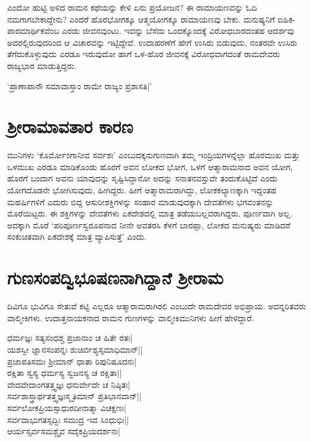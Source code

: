 ಎಂದೋ ಹುಟ್ಟಿ ಅಳಿದ ರಾಮನ ಕಥೆಯನ್ನು ಕೇಳಿ ಏನು ಪ್ರಯೋಜನ? ಈ ರಾಮಾಯಣವನ್ನು ಓದಿ ನಮಗಾಗಬೇಕಾದ್ದೇನು? ಎಂದರೆ ಹೊರಭೋಗಕ್ಕೂ ಆತ್ಮಯೋಗಕ್ಕೂ ರಾಮಾಯಣವು ಬೇಕು. ಮನುಷ್ಯನಿಗೆ ಐಹಿಕ-ಪಾರಮಾರ್ಥಿಕವೆಂಬ ಎರಡು ಜೀವನವುಂಟು. ಇವನ್ನು ಬೆಸೆದು ಒಂದಕ್ಕೊಂದಕ್ಕೆ ವಿರೋಧಬಾರದಂತಹ ಆದರ್ಶವು ಅದರಲ್ಲಿರುವುದರಿಂದ ಆ‌ ವಿಚಾರವನ್ನು ಇಟ್ಟಿದ್ದೇವೆ. ಉದಾಹರಣೆಗೆ ಹೇಗೆ ಉಸಿರು ಬಿಡುವುದು, ನಂತರವೇ ಉಸಿರು ತೆಗೆದುಕೊಳ್ಳುವುದು ಎರಡೂ ಇರುವುದೋ ಹಾಗೆ ಒಳ-ಹೊರ ಜೀವನಕ್ಕೆ ವಿರೋಧವಾಗದಂತೆ ರಾಮದೇವರು ರಾಜ್ಯಭಾರ ಮಾಡುತ್ತಿದ್ದರು.

\begin{shloka}
`ಪ್ರಾಣಾಪಾನೌ ಸಮಾವಾಸ್ತಾಂ ರಾಮೇ ರಾಜ್ಯಂ ಪ್ರಶಾಸತಿ|'
\end{shloka}

\section*{ಶ್ರೀರಾಮಾವತಾರ ಕಾರಣ}

ಮುನಿಗಳು `ಕೊರ್ಮೋಂಗಾನೀವ ಸರ್ವಶಃ' ಎಂಬುದಕ್ಕನುಗುಣವಾಗಿ ತಮ್ಮ ಇಂದ್ರಿಯಗಳನ್ನೆಲ್ಲಾ ಹೊರಮುಖ ಮತ್ತು ಒಳಮುಖ ಎರಡೂ ಮಾಡಿಕೊಂಡು ಹೊರಗೆ ಅವನ ಲೋಕದ ಭೋಗ, ಒಳಗೆ ಆತ್ಮಾರಾಮನಾದ ಅವನ ಯೋಗ, ಹೊರಗೆ ಬಂದಾಗ ಅವನು ಯಾವುದನ್ನು ಸೃಷ್ಟಿಸಿದ್ದಾನೋ ಅದನ್ನು ಸನಾತನವಸ್ತುವೇ ತಂದುಕೊಟ್ಟಿದೆ ಎಂದು ಯೋಗದೊಡನೇ ಭೋಗಿಸುವುದು, ಹೀಗಿದ್ದರು. ಹೀಗೆ ಆತ್ಮಾರಾಮರಾಗಿದ್ದು, ಲೋಕಕಲ್ಯಾಣಕ್ಕಾಗಿ ಇದ್ದಂತಹ ಮಹರ್ಷಿಗಳಿಗೆ ಎದುರು ಬಿದ್ದ ಆಸುರೀಶಕ್ತಿಗಳನ್ನು ಸಂಹಾರ ಮಾಡುವುದಕ್ಕಾಗಿ ದೇವತೆಗಳು ಭಗವಂತನನ್ನು ಮೊರೆಯಿಟ್ಟರು. ಈ ಶಕ್ತಿಗಳನ್ನು ದೇವತೆಗಳು ಏಕದೇಶದಲ್ಲಿ ಮಾತ್ರ ತಡೆಯಬಲ್ಲವರಾಗಿದ್ದರು. ಪೂರ್ಣವಾಗಿ ಅಲ್ಲ. ಅದಕ್ಕಾಗಿ ಮೊರೆ `ಪರಿಪೂರ್ಣಸ್ವರೂಪನಾದ ನೀನೇ ಅವತರಸಿ ಕೆಳಗೆ ಬಾರಪ್ಪಾ, ಲೋಕದ ಮನುಷ್ಯರು ಮಾಡಿದರೆ ಸಂಕುಚಿತವಾಗಿ ಏಕದೇಶಕ್ಕೆ ಮಾತ್ರ ವ್ಯಾಪಿಸುತ್ತೆ' ಎಂದು.

\section*{ಗುಣಸಂಪದ್ವಿಭೂಷಣನಾಗಿದ್ದಾನೆ ಶ್ರೀರಾಮ}

ದಿವಿಗೂ ಭುವಿಗೂ ಸೇತುವೆ ಕಟ್ಟಿ ಎಲ್ಲರೂ ಆತ್ಮಾರಾಮರಾಗಿರಲಿ ಎಂಬುದೇ ರಾಮದೇವರ ಅಭಿಪ್ರಾಯ. ಅದನ್ನರಿತವರು ವಾಲ್ಮೀಕಿಗಳು. ಉದಾತ್ತನಾಯಕನಾದ ರಾಮನ ಗುಣಗಳನ್ನು ವಾಲ್ಮೀಕಿಮುನಿಗಳು ಹೀಗೆ ಹೇಳಿದ್ದಾರೆ.

\begin{shloka}
ಧರ್ಮಜ್ಞಃ ಸತ್ಯಸಂಧಶ್ಚ ಪ್ರಜಾನಾಂ ಚ ಹಿತೇ ರತಃ|\\
ಯಶಸ್ವೀ ಜ್ಞಾನಸಂಪನ್ನಃ ಶುಚಿರ್ವಶ್ಯಸ್ಸಮಾಧಿಮಾನ್||\\
ಪ್ರಜಾಪತಿಸಮಃ ಶ್ರೀಮಾನ್ ಧಾತಾ ರಿಪುನಿಷೂದನಃ|\\
ರಕ್ಷಿತಾ ಸ್ವಸ್ಯ ಧರ್ಮಸ್ಯ ಸ್ವಜನಸ್ಯ ಚ ರಕ್ಷಿತಾ||\\
ವೇದವೇದಾಂಗತತ್ತ್ವಜ್ಞಃ ಧನುರ್ವೇದೇ ಚ ನಿಷ್ಠಿತಃ|\\
ಸರ್ವಶಾಸ್ತ್ರಾರ್ಥತತ್ತ್ವಜ್ಞಃಸ್ಮೃತಿಮಾನ್ ಪ್ರತಿಭಾನವಾನ್||\\
ಸರ್ವಲೋಕಪ್ರಿಯಸ್ಸಾಧುರದೀನಾತ್ಮಾ ವಿಚಕ್ಷಣಃ|\\
ಸರ್ವದಾಭುಗತಸ್ಸದ್ಭಿಃ ಸಮುದ್ರ ಇವ ಸಿಂಧುಭಿಃ||\\
ಆರ್ಯಸ್ಸರ್ವಸಮಶ್ಚೈವ ಸದೈಕಪ್ರಿಯದರ್ಶನಃ|
\end{shloka}

